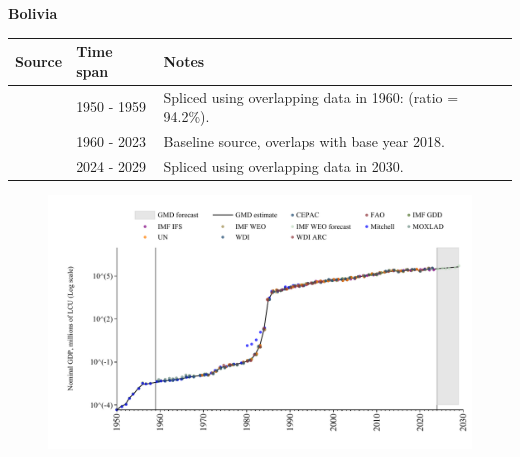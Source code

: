 \documentclass[12pt,a4paper,landscape]{article}
\begin{document}
\begin{adjustbox}{max totalsize={\paperwidth}{\paperheight},center}
\begin{minipage}[t][\textheight][t]{\textwidth}
\vspace*{0.5cm}
{}
\begin{center}
{\Large\bfseries Bolivia}
\end{center}
\vspace{0.5cm}
\begin{table}[H]
\centering
\small
\begin{tabular}{|l|l|l|}
\hline
\textbf{Source} & \textbf{Time span} & \textbf{Notes} \\
\hline
\rowcolor{white}\cite{IMF_GDD}& 1950 - 1959 &Spliced using overlapping data in 1960: (ratio = 94.2\%).\\
\rowcolor{lightgray}\cite{WDI}& 1960 - 2023 &Baseline source, overlaps with base year 2018.\\
\rowcolor{white}\cite{IMF_WEO_forecast}& 2024 - 2029 &Spliced using overlapping data in 2030.\\
\hline
\end{tabular}
\end{table}
\begin{figure}[H]
\centering
\includegraphics[width=\textwidth,height=0.6\textheight,keepaspectratio]{graphs/BOL_nGDP.pdf}
\end{figure}
\end{minipage}
\end{adjustbox}
\end{document}
